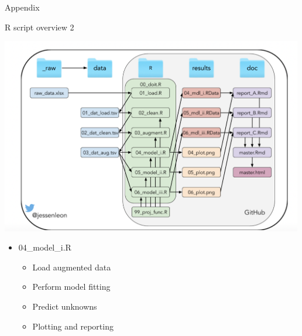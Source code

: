 \documentclass[ignorenonframetext,]{beamer}
\providecommand{\tightlist}{%
  \setlength{\itemsep}{0pt}\setlength{\parskip}{0pt}}
\begin{document}
\begin{frame}{Appendix}
\protect\hypertarget{appendix-1}{}

\begin{block}{R script overview 2}

\includegraphics[width=5.20833in,height=\textheight]{project_organisation.png}

\begin{itemize}
\tightlist
\item
  04\_model\_i.R

  \begin{itemize}
  \tightlist
  \item
    Load augmented data
  \item
    Perform model fitting
  \item
    Predict unknowns
  \item
    Plotting and reporting
  \end{itemize}
\end{itemize}

\end{block}

\end{frame}
\end{document}
